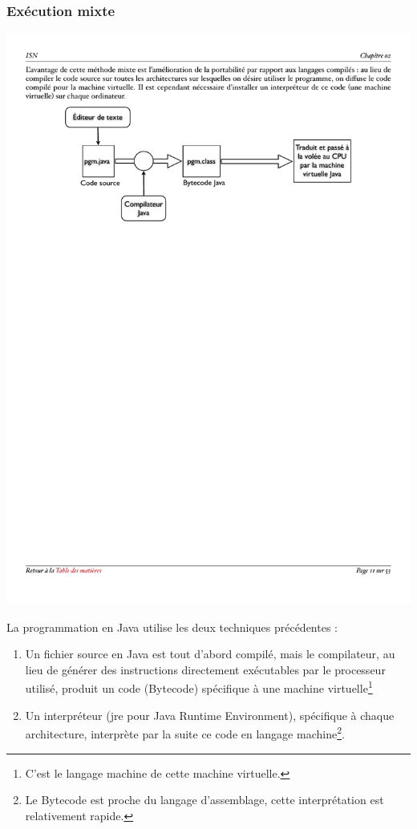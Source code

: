 \documentclass[utf8,10pt]{beamer}
\begin{document}
\begin{frame}
    \frametitle{Exécution mixte}
    \begin{block}{}
    \begin{center}
        \includegraphics[scale=0.4]{./images/Execution-mixte}
    \end{center}
    \end{block}
    
    La programmation en Java utilise les deux techniques précédentes :
    \begin{enumerate}
        \item Un fichier source en Java est tout d’abord compilé, mais le compilateur, au lieu de générer 
        des instructions directement exécutables par le processeur utilisé, produit un code (\alert{Bytecode})
         spécifique à une \alert{machine virtuelle}\footnote{C'est le langage machine de cette machine virtuelle.}
         \item Un interpréteur (jre pour Java Runtime Environment), spécifique à chaque architecture, interprète par la suite ce code en langage machine\footnote{Le Bytecode est proche du langage d'assemblage, cette interprétation est relativement rapide.}.

    \end{enumerate}
\end{frame}
\end{document}
